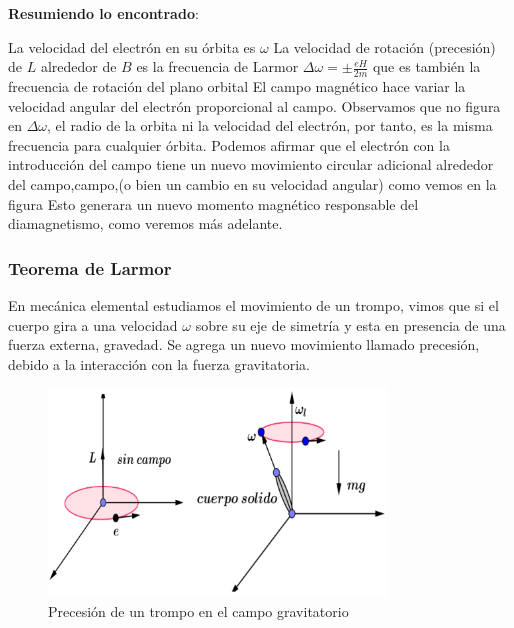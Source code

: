 \textbf{Resumiendo lo encontrado}:

La velocidad del electrón en su órbita es $\omega$ La velocidad de rotación (precesión) de $L$ alrededor de $B$ es la frecuencia de Larmor $\Delta\omega=\pm\frac{eH}{2m}$ que es también la
frecuencia de rotación del plano orbital El campo magnético hace variar la velocidad angular del electrón proporcional al campo. Observamos que no figura en $\Delta\omega$, el radio de la orbita ni la velocidad del electrón, por tanto, es la misma frecuencia para cualquier órbita.
Podemos afirmar que el electrón con la introducción del campo tiene un nuevo movimiento circular adicional alrededor del campo,campo,(o bien un cambio en su velocidad angular) como vemos en la
figura Esto generara un nuevo momento magnético responsable del diamagnetismo, como veremos más
adelante.




















\subsubsection{Teorema de Larmor}
En mecánica elemental estudiamos el movimiento de un trompo, vimos que si el cuerpo gira a una velocidad $\omega$ sobre su eje de simetría y esta en presencia de una fuerza externa, gravedad. Se agrega un nuevo movimiento llamado precesión, debido a la interacción con la fuerza gravitatoria.

\begin{figure}[H]
    \centering
    \includegraphics[width=0.8\textwidth]{./Figures/Larmor1}
	\caption{Precesión de un trompo en el campo gravitatorio}
	\label{fig:Larmor1}
\end{figure}

